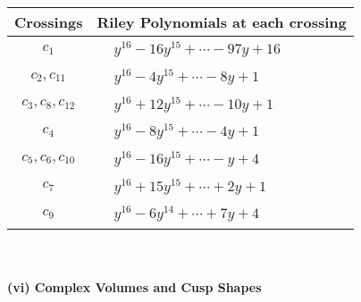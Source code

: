 \documentclass[1p]{elsarticle_modified}
\theoremstyle{definition}
\begin{document}
\begin{tabular}{m{50pt}|m{274pt}}
Crossings & \hspace{64pt}Riley Polynomials at each crossing \\
\hline $$\begin{aligned}c_{1}\end{aligned}$$&$\begin{aligned}
&y^{16}-16 y^{15}+\cdots-97 y+16
\end{aligned}$\\
\hline $$\begin{aligned}c_{2},c_{11}\end{aligned}$$&$\begin{aligned}
&y^{16}-4 y^{15}+\cdots-8 y+1
\end{aligned}$\\
\hline $$\begin{aligned}c_{3},c_{8},c_{12}\end{aligned}$$&$\begin{aligned}
&y^{16}+12 y^{15}+\cdots-10 y+1
\end{aligned}$\\
\hline $$\begin{aligned}c_{4}\end{aligned}$$&$\begin{aligned}
&y^{16}-8 y^{15}+\cdots-4 y+1
\end{aligned}$\\
\hline $$\begin{aligned}c_{5},c_{6},c_{10}\end{aligned}$$&$\begin{aligned}
&y^{16}-16 y^{15}+\cdots- y+4
\end{aligned}$\\
\hline $$\begin{aligned}c_{7}\end{aligned}$$&$\begin{aligned}
&y^{16}+15 y^{15}+\cdots+2 y+1
\end{aligned}$\\
\hline $$\begin{aligned}c_{9}\end{aligned}$$&$\begin{aligned}
&y^{16}-6 y^{14}+\cdots+7 y+4
\end{aligned}$\\
\hline
\end{tabular}\\~\\
\newpage\flushleft \textbf{(vi) Complex Volumes and Cusp Shapes}
\end{document}
